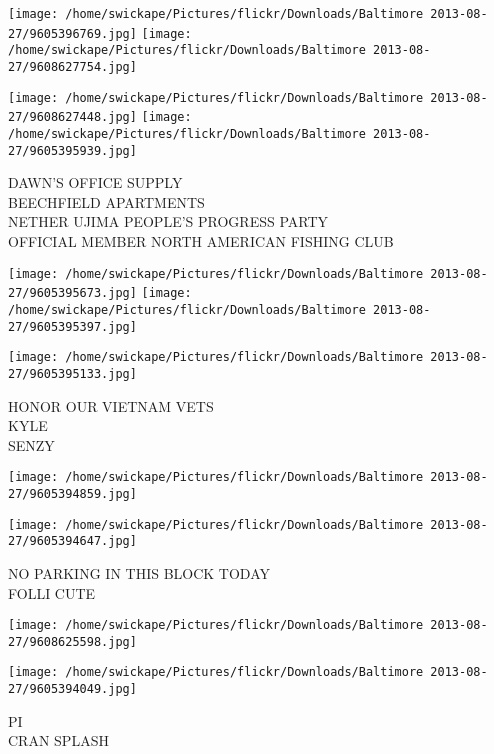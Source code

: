 \documentclass[10pt,letterpaper]{article}
\begin{document}
\texttt{[image: /home/swickape/Pictures/flickr/Downloads/Baltimore 2013-08-27/9605396769.jpg]}
\texttt{[image: /home/swickape/Pictures/flickr/Downloads/Baltimore 2013-08-27/9608627754.jpg]}

\texttt{[image: /home/swickape/Pictures/flickr/Downloads/Baltimore 2013-08-27/9608627448.jpg]}
\texttt{[image: /home/swickape/Pictures/flickr/Downloads/Baltimore 2013-08-27/9605395939.jpg]}

DAWN'S OFFICE SUPPLY\\
BEECHFIELD APARTMENTS\\
NETHER UJIMA PEOPLE'S PROGRESS PARTY\\
OFFICIAL MEMBER NORTH AMERICAN FISHING CLUB\\
\pagebreak

\texttt{[image: /home/swickape/Pictures/flickr/Downloads/Baltimore 2013-08-27/9605395673.jpg]}
\texttt{[image: /home/swickape/Pictures/flickr/Downloads/Baltimore 2013-08-27/9605395397.jpg]}

\vspace{0.25in}
\texttt{[image: /home/swickape/Pictures/flickr/Downloads/Baltimore 2013-08-27/9605395133.jpg]}

HONOR OUR VIETNAM VETS\\
KYLE\\
SENZY\\
\pagebreak

\texttt{[image: /home/swickape/Pictures/flickr/Downloads/Baltimore 2013-08-27/9605394859.jpg]}

\vspace{0.25in}
\texttt{[image: /home/swickape/Pictures/flickr/Downloads/Baltimore 2013-08-27/9605394647.jpg]}

NO PARKING IN THIS BLOCK TODAY\\
FOLLI CUTE\\
\pagebreak

\texttt{[image: /home/swickape/Pictures/flickr/Downloads/Baltimore 2013-08-27/9608625598.jpg]}

\vspace{0.25in}
\texttt{[image: /home/swickape/Pictures/flickr/Downloads/Baltimore 2013-08-27/9605394049.jpg]}

PI\\
CRAN SPLASH\\
\pagebreak
\end{document}
